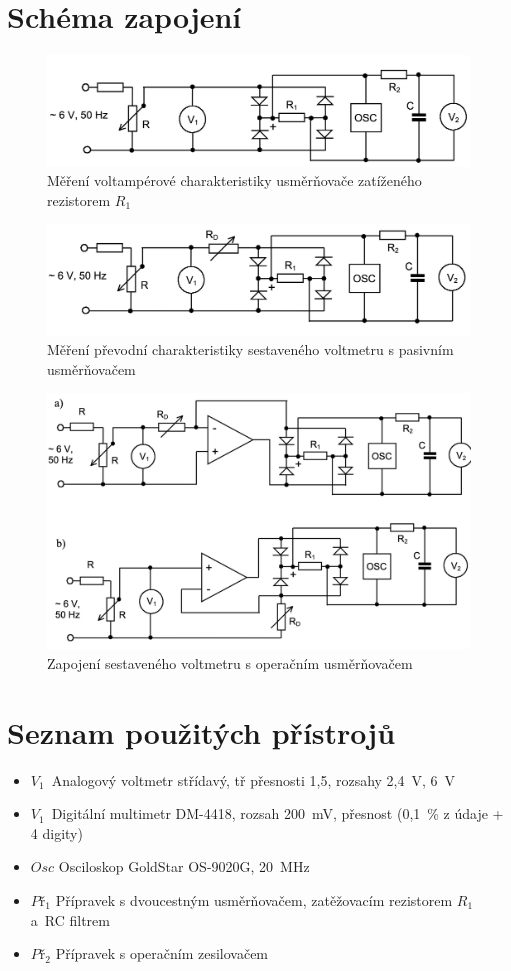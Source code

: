\documentclass[a4paper,12pt]{article}   %
\newcommand{\ri}{$R_1$}
\newcommand{\vi}{$V_1$}
\newcommand{\vii}{$V_1$}
\begin{document}
\section{Schéma zapojení}
\label{schema_zapojeni}
\begin{figure}[h!]
    \centering
    \includegraphics[width=.8\textwidth]{va_char.png}
    \caption{Měření voltampérové charakteristiky usměrňovače zatíženého rezistorem \ri}
    \label{fig:va}
\end{figure}
\begin{figure}[h!]
    \centering
    \includegraphics[width=.8\textwidth]{prevod_char.png}
    \caption{Měření převodní charakteristiky sestaveného voltmetru s pasivním usměrňovačem}
    \label{va:prevod}
\end{figure}
\begin{figure}[h!]
    \centering
    \includegraphics[width=.8\textwidth]{voltmetr.png}
    \caption{Zapojení sestaveného voltmetru s operačním usměrňovačem}
    \label{fig:op}
\end{figure}

\section{Seznam použitých přístrojů}
\begin{itemize}
    \item \vi~Analogový voltmetr střídavý, tř přesnosti 1,5, rozsahy 2,4~V, 6~V
    \item \vii~Digitální multimetr DM-4418, rozsah 200~mV, přesnost (0,1~\% z údaje + 4 digity)\
    \item $Osc$ Osciloskop GoldStar OS-9020G, 20~MHz
    \item $Př_1$ Přípravek s dvoucestným usměrňovačem, zatěžovacím rezistorem \ri~ a~RC filtrem
    \item $Př_2$ Přípravek s operačním zesilovačem
\end{itemize}
\end{document}
